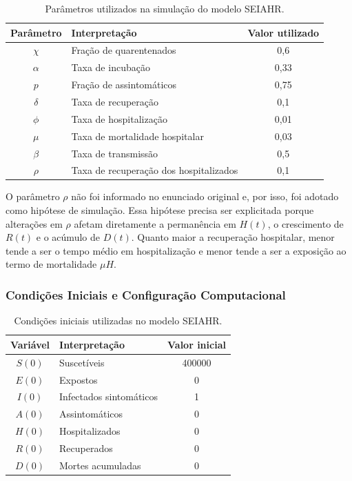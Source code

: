 \begin{table}[H]
    \centering
    \caption{Parâmetros utilizados na simulação do modelo SEIAHR.}
    \begin{tabular}{c|l|c}
        \hline
        \textbf{Parâmetro} & \textbf{Interpretação} & \textbf{Valor utilizado} \\
        \hline
        \(\chi\) & Fração de quarentenados & 0,6 \\
        \(\alpha\) & Taxa de incubação & 0,33 \\
        \(p\) & Fração de assintomáticos & 0,75 \\
        \(\delta\) & Taxa de recuperação & 0,1 \\
        \(\phi\) & Taxa de hospitalização & 0,01 \\
        \(\mu\) & Taxa de mortalidade hospitalar & 0,03 \\
        \(\beta\) & Taxa de transmissão & 0,5 \\
        \(\rho\) & Taxa de recuperação dos hospitalizados & 0,1 \\
        \hline
    \end{tabular}
    \label{tab:parametros-seiahr}
\end{table}

O parâmetro \(\rho\) não foi informado no enunciado original e, por isso, foi adotado como hipótese de simulação. Essa hipótese precisa ser explicitada porque alterações em \(\rho\) afetam diretamente a permanência em \(H(t)\), o crescimento de \(R(t)\) e o acúmulo de \(D(t)\). Quanto maior a recuperação hospitalar, menor tende a ser o tempo médio em hospitalização e menor tende a ser a exposição ao termo de mortalidade \(\mu H\).

\subsubsection{Condições Iniciais e Configuração Computacional}

\begin{table}[H]
    \centering
    \caption{Condições iniciais utilizadas no modelo SEIAHR.}
    \begin{tabular}{c|l|c}
        \hline
        \textbf{Variável} & \textbf{Interpretação} & \textbf{Valor inicial} \\
        \hline
        \(S(0)\) & Suscetíveis & 400000 \\
        \(E(0)\) & Expostos & 0 \\
        \(I(0)\) & Infectados sintomáticos & 1 \\
        \(A(0)\) & Assintomáticos & 0 \\
        \(H(0)\) & Hospitalizados & 0 \\
        \(R(0)\) & Recuperados & 0 \\
        \(D(0)\) & Mortes acumuladas & 0 \\
        \hline
    \end{tabular}
    \label{tab:condicoes-iniciais-seiahr}
\end{table}

